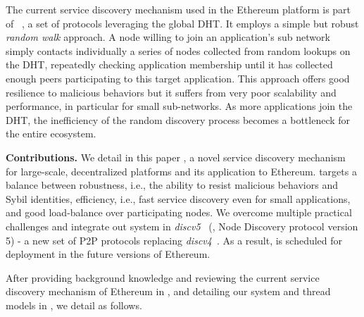 The current service discovery mechanism used in the Ethereum platform is part of \discv~\cite{discv4}, a set of protocols leveraging the global DHT.
It employs a simple but robust \emph{random walk} approach.
A node willing to join an application's sub network simply contacts individually a series of nodes collected from random lookups on the DHT, repeatedly checking application membership until it has collected enough peers participating to this target application. %
This approach offers good resilience to malicious behaviors
but it suffers from very poor scalability and performance, in particular for small sub-networks.
As more applications join the DHT, the inefficiency of the random discovery process becomes a bottleneck for the entire ecosystem.  

\smallskip
\noindent
\textbf{Contributions.}
%
We detail in this paper \sysname, a novel service discovery mechanism for large-scale, decentralized platforms and its application to Ethereum.
\sysname targets a balance between robustness, i.e., the ability to resist malicious behaviors and Sybil identities, efficiency, i.e., fast service discovery even for small applications, and good load-balance over participating nodes.
We overcome multiple practical challenges and integrate out system in \emph{discv5}~\cite{discv5} (\ie, Node Discovery protocol version 5) - a new set of P2P protocols replacing \emph{discv4}~\cite{discv4}. As a result, \sysname is scheduled for deployment in the future versions of Ethereum.

After providing background knowledge and reviewing the current service discovery mechanism of Ethereum in , and detailing our system and thread models in , we detail \sysname as follows.

